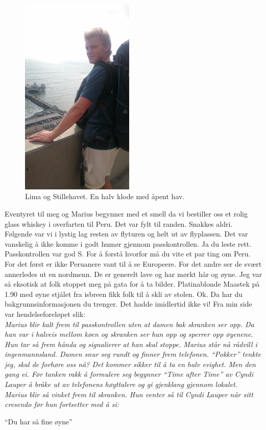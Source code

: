 \begin{figure}
	\begin{center}
		\includegraphics[width=0.48\textwidth]{stllehavet}
	\end{center}
	\caption*{Lima og Stillehavet. En halv klode med åpent hav.}
\end{figure}
Eventyret til meg og Marius begynner med et smell da vi bestiller oss
et
rolig glass whiskey i overfarten til Peru. Det var fylt til
randen. Snakkes aldri.
Følgende var vi i lystig lag resten av flyturen og helt ut av
flyplassen. Det var vanskelig å ikke komme i godt humør gjennom
passkontrollen. Ja du leste rett. Passkontrollen var god S. For å
forstå hvorfor må du vite et par ting om Peru. For det først er ikke
Peruanere vant
til å se Europeere. For det andre ser de svært annerledes ut en
nordmenn.
De er generelt lave og har mørkt hår og øyne. Jeg
var så eksotisk at folk stoppet meg på gata for å ta bilder.
Platinablonde Maastek på 1.90 med øyne stjålet fra isbreen fikk folk
til å skli av stolen. Ok. Da har du bakgrunnsinformasjonen du
trenger. Det hadde imidlertid ikke vi! Fra min side var
hendelseforeløpet slik: \\

\textit{Marius
blir kalt frem til passkontrollen uten at damen bak skranken ser opp.
Da han var i  halveis mellom køen og skranken ser hun
opp og sperrer opp
øyenene. Hun tar så frem hånda og signalierer at han skal stoppe.
Marius står nå rådvill i ingenmannsland. Damen snur seg rundt
og finner frem telefonen. ``Pokker'' tenkte jeg, skal de forhøre oss
nå? Det kommer sikker til å ta en halv evighet. Men den gang ei. Før
tanken rakk å formulere seg begynner ``Time after Time'' av Cyndi
Lauper å bråke ut av telefonens høyttalere og gi gjenklang gjennom
lokalet. Marius blir så vinket frem til skranken. Hun venter så til
Cyndi Lauper når sitt cresendo før hun fortsetter
med å si:}\\
\begin{dialogue}
	\item ``Du har så fine øyne'' 
\end{dialogue}\\

